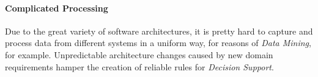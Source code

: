 %
%
%
%
%
%
%

\paragraph{Complicated Processing}
\label{complicated_processing_heading}

Due to the great variety of software architectures, it is pretty hard to
capture and process data from different systems in a uniform way, for reasons
of \emph{Data Mining}, for example. Unpredictable architecture changes caused
by new domain requirements hamper the creation of reliable rules for
\emph{Decision Support}.
